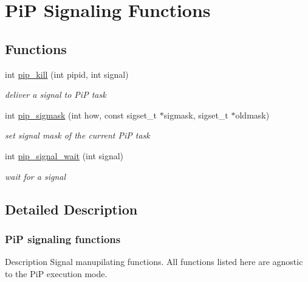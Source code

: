 \hypertarget{group__pip-signal}{\section{Pi\-P Signaling Functions}
\label{group__pip-signal}
}
\subsection*{Functions}
\begin{DoxyCompactItemize}
\item 
int \hyperlink{group__pip-signal_ga4a396f38920d94b71dcfd3c898fbb82b}{pip\-\_\-kill} (int pipid, int signal)
\begin{DoxyCompactList}\small\item\em deliver a signal to Pi\-P task \end{DoxyCompactList}\item 
int \hyperlink{group__pip-signal_gaf546ee24368b118e937aadd2dbea2217}{pip\-\_\-sigmask} (int how, const sigset\-\_\-t $\ast$sigmask, sigset\-\_\-t $\ast$oldmask)
\begin{DoxyCompactList}\small\item\em set signal mask of the current Pi\-P task \end{DoxyCompactList}\item 
int \hyperlink{group__pip-signal_ga2048e7685a030e61e8c529c474899feb}{pip\-\_\-signal\-\_\-wait} (int signal)
\begin{DoxyCompactList}\small\item\em wait for a signal \end{DoxyCompactList}\end{DoxyCompactItemize}


\subsection{Detailed Description}
\hypertarget{pip-signal}{}\subsubsection{Pi\-P signaling functions}\label{pip-signal}
\begin{DoxyParagraph}{Description}
Signal manupilating functions. All functions listed here are agnostic to the Pi\-P execution mode. 
\end{DoxyParagraph}


